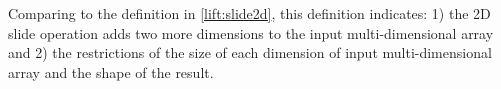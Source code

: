\documentclass{l4proj}
\begin{document}
\begin{code}
\>[0]\AgdaSpace{}%
\AgdaSymbol{\{}\AgdaSymbol{\}}\AgdaSpace{}%
\AgdaSymbol{\{}\AgdaSymbol{\}}\AgdaSpace{}%
\AgdaSpace{}%
\AgdaSpace{}%
\AgdaSpace{}%
\AgdaSymbol{=}\AgdaSpace{}%
\AgdaSpace{}%
\AgdaSpace{}%
\AgdaSymbol{(}\AgdaSpace{}%
\AgdaSymbol{\{}\AgdaSymbol{\}}\AgdaSpace{}%
\AgdaSpace{}%
\AgdaSpace{}%
\AgdaSymbol{(}\AgdaSpace{}%
\AgdaSymbol{(}\AgdaSpace{}%
\AgdaSymbol{\{}\AgdaSymbol{\}}\AgdaSpace{}%
\AgdaSpace{}%
\AgdaSymbol{)}\AgdaSpace{}%
\AgdaSymbol{))}\<%
\end{code}
Comparing to the definition in \ref{lift:slide2d}, this definition indicates: 1) the 2D slide operation adds two more dimensions to the input multi-dimensional array and 2) the restrictions of the size of each dimension of input multi-dimensional array and the shape of the result.
\end{document}

